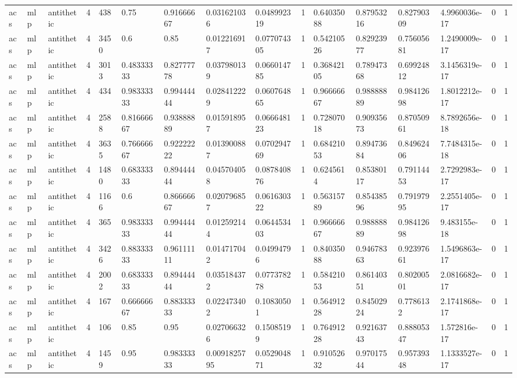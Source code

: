 \begin{tabular}{llllllllllllllll}
acs & mlp & antithetic & 4 & 438 & 0.75 & 0.91666667 & 0.031621036 & 0.048992319 & 1 & 0.64035088 & 0.87953216 & 0.82790309 & 4.9960036e-17 & 0 & 1 \\
acs & mlp & antithetic & 4 & 3450 & 0.6 & 0.85 & 0.012216917 & 0.077074305 & 1 & 0.54210526 & 0.82923977 & 0.75605681 & 1.2490009e-17 & 0 & 1 \\
acs & mlp & antithetic & 4 & 3013 & 0.48333333 & 0.82777778 & 0.037980139 & 0.066014785 & 1 & 0.36842105 & 0.78947368 & 0.69924812 & 3.1456319e-17 & 0 & 1 \\
acs & mlp & antithetic & 4 & 434 & 0.98333333 & 0.99444444 & 0.028412229 & 0.060764865 & 1 & 0.96666667 & 0.98888889 & 0.98412698 & 1.8012212e-17 & 0 & 1 \\
acs & mlp & antithetic & 4 & 2588 & 0.81666667 & 0.93888889 & 0.015918957 & 0.066648123 & 1 & 0.72807018 & 0.90935673 & 0.87050961 & 8.7892656e-18 & 0 & 1 \\
acs & mlp & antithetic & 4 & 3635 & 0.76666667 & 0.92222222 & 0.013900887 & 0.070294769 & 1 & 0.68421053 & 0.89473684 & 0.84962406 & 7.7484315e-18 & 0 & 1 \\
acs & mlp & antithetic & 4 & 1480 & 0.68333333 & 0.89444444 & 0.045704058 & 0.087840876 & 1 & 0.6245614 & 0.85380117 & 0.79114453 & 2.7292983e-17 & 0 & 1 \\
acs & mlp & antithetic & 4 & 1166 & 0.6 & 0.86666667 & 0.020796857 & 0.061630322 & 1 & 0.56315789 & 0.85438596 & 0.79197995 & 2.2551405e-17 & 0 & 1 \\
acs & mlp & antithetic & 4 & 365 & 0.98333333 & 0.99444444 & 0.012592144 & 0.064453403 & 1 & 0.96666667 & 0.98888889 & 0.98412698 & 9.483155e-18 & 0 & 1 \\
acs & mlp & antithetic & 4 & 3426 & 0.88333333 & 0.96111111 & 0.014717042 & 0.04994796 & 1 & 0.84035088 & 0.94678363 & 0.92397661 & 1.5496863e-17 & 0 & 1 \\
acs & mlp & antithetic & 4 & 2002 & 0.68333333 & 0.89444444 & 0.035184372 & 0.077378278 & 1 & 0.58421053 & 0.86140351 & 0.80200501 & 2.0816682e-17 & 0 & 1 \\
acs & mlp & antithetic & 4 & 167 & 0.66666667 & 0.88333333 & 0.022473402 & 0.10830501 & 1 & 0.56491228 & 0.84502924 & 0.7786132 & 2.1741868e-17 & 0 & 1 \\
acs & mlp & antithetic & 4 & 106 & 0.85 & 0.95 & 0.027066326 & 0.15085199 & 1 & 0.76491228 & 0.92163743 & 0.88805347 & 1.572816e-17 & 0 & 1 \\
acs & mlp & antithetic & 4 & 1459 & 0.95 & 0.98333333 & 0.0091825795 & 0.052904871 & 1 & 0.91052632 & 0.97017544 & 0.95739348 & 1.1333527e-17 & 0 & 1 \\

\end{tabular}
